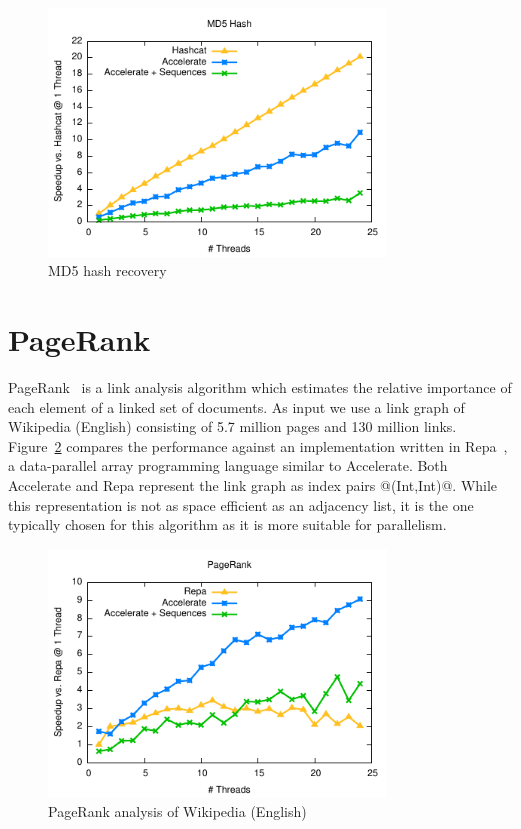 \begin{figure}
\centering
\includegraphics[width=0.8\textwidth]{benchmarks/hashcat/figs/hashcat.pdf}
\caption{MD5 hash recovery}
\label{fig:hashcat}
\end{figure}

\section{PageRank}

PageRank~\cite{Page:pagerank} is a link analysis algorithm which
estimates the relative importance of each element of a linked set of documents. As
input we use a link graph of Wikipedia (English) consisting of 5.7 million pages
and 130 million links. Figure~\ref{fig:pagerank} compares the performance
against an implementation written in Repa~\cite{Keller:Repa,Lippmeier:Guiding},
a data-parallel array programming language similar to Accelerate. Both
Accelerate and Repa represent the link graph as index pairs @(Int,Int)@. While
this representation is not as space efficient as an adjacency list, it is the
one typically chosen for this algorithm as it is more suitable for parallelism.

\begin{figure}
\centering
\includegraphics[width=0.8\textwidth]{benchmarks/pagerank/figs/pagerank.pdf}
\caption{PageRank analysis of Wikipedia (English)}
\label{fig:pagerank}
\end{figure}

